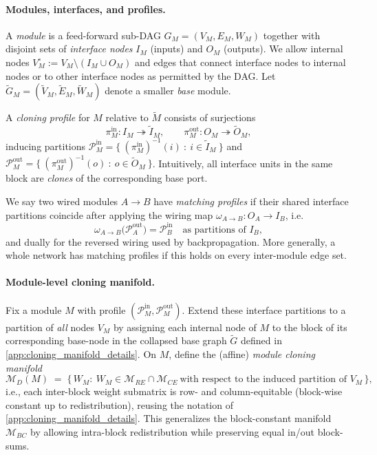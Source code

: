\documentclass{article}
\newcommand{\BaseG}{\widetilde{G}}
\newcommand{\ManifoldD}{\mathcal{M}_{D}}
\newcommand{\ManifoldRE}{\mathcal{M}_{RE}}
\newcommand{\ManifoldCE}{\mathcal{M}_{CE}}
\newcommand{\ManifoldBC}{\mathcal{M}_{BC}}
\numberwithin{figure}{section}
\begin{document}
\paragraph{Modules, interfaces, and profiles.}
A \emph{module} is a feed-forward sub-DAG $G_M=(V_M,E_M,W_M)$ together with disjoint sets of \emph{interface nodes} $I_M$ (inputs) and $O_M$ (outputs). We allow internal nodes $V_M^\circ:=V_M\setminus(I_M\cup O_M)$ and edges that connect interface nodes to internal nodes or to other interface nodes as permitted by the DAG.
Let $\widetilde{G}_M=(\widetilde{V}_M,\widetilde{E}_M,\widetilde{W}_M)$ denote a smaller \emph{base} module.

A \emph{cloning profile} for $M$ relative to $\widetilde{M}$ consists of surjections
\[
\pi^\mathrm{in}_M:I_M\twoheadrightarrow\widetilde{I}_M,
\qquad
\pi^\mathrm{out}_M:O_M\twoheadrightarrow\widetilde{O}_M,
\]
inducing partitions $\mathcal{P}^\mathrm{in}_M=\{\ (\pi^\mathrm{in}_M)^{-1}(i)\ :\ i\in\widetilde{I}_M\ \}$ and $\mathcal{P}^\mathrm{out}_M=\{\ (\pi^\mathrm{out}_M)^{-1}(o)\ :\ o\in\widetilde{O}_M\ \}$. Intuitively, all interface units in the same block are \emph{clones} of the corresponding base port.

We say two wired modules $A\to B$ have \emph{matching profiles} if their shared interface partitions coincide after applying the wiring map $\omega_{A\to B}:O_A\to I_B$, i.e.
\[
\omega_{A\to B}\big(\mathcal{P}^\mathrm{out}_A\big)=\mathcal{P}^\mathrm{in}_B
\quad\text{as partitions of }I_B,
\]
and dually for the reversed wiring used by backpropagation. More generally, a whole network has matching profiles if this holds on every inter-module edge set.

\paragraph{Module-level cloning manifold.}
Fix a module $M$ with profile $(\mathcal{P}^\mathrm{in}_M,\mathcal{P}^\mathrm{out}_M)$. Extend these interface partitions to a partition of \emph{all} nodes $V_M$ by assigning each internal node of $M$ to the block of its corresponding base-node in the collapsed base graph $\BaseG$ defined in \cref{app:cloning_manifold_details}. On $M$, define the (affine) \emph{module cloning manifold}
\[
\ManifoldD(M)\;=\;\{\,W_M:\ W_M \in \ManifoldRE\cap\ManifoldCE\ \text{with respect to the induced partition of }V_M\,\},
\]
i.e., each inter-block weight submatrix is row- and column-equitable (block-wise constant up to redistribution), reusing the notation of \cref{app:cloning_manifold_details}. This generalizes the block-constant manifold $\ManifoldBC$ by allowing intra-block redistribution while preserving equal in/out block-sums.
\end{document}
